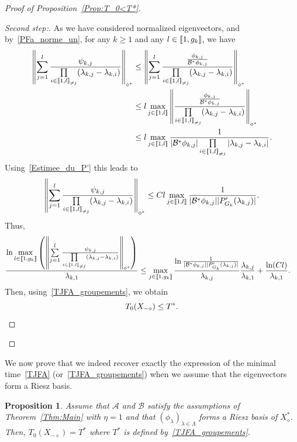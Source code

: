 \documentclass[11pt]{article}
\newtheorem{prop}[theo]{Proposition}
\theoremstyle{definition}
\newenvironment{proofc}{\begin{proof}}{\end{proof}}
\numberwithin{equation}{section}
\numberwithin{figure}{section}
\numberwithin{table}{section}
\newenvironment{step}[1]{\begin{proof}[#1]}{\let\qed\relax\end{proof}}
\newcommand{\llbracket}{\mathopen{[\mkern -2.7mu[}}
\newcommand{\rrbracket}{\mathclose{]\mkern -2.7mu]}}
\newcommand{\inter}[2]{\llbracket #1,#2 \rrbracket}
\newcommand{\interexclu}[3]{\llbracket #1,#2\rrbracket_{\neq #3}}
\newcommand\A{\mathcal{A}}
\newcommand\B{\mathcal{B}}
\newcommand\Bs{\mathcal{B}^*}
\newcommand{\Xalphas}{X_\diamond^*}
\newcommand{\Xmalpha}{X_{-\diamond}}
\newcommand{\normeXalphas}[1]{\left\| #1 \right\|_{\diamond^*}}
\newcommand{\n}{g}
\begin{document}
\begin{proofc}[{Proof of Proposition~\ref{Prop:T_0<T*}}]
\begin{step}{Second step:}
As we have considered normalized eigenvectors, and by~\eqref{PFa_norme_un}, for any $k \geq 1$ and any $l\in \inter{1}{\n_k}$, we have
\begin{align*}
\normeXalphas{ \sum\limits_{j=1}^l \frac{ \psi_{k,j} }{\prod\limits_{i\in \interexclu{1}{l}{j}} (\lambda_{k,j}-\lambda_{k,i})} } & \leq \normeXalphas{ \sum\limits_{j=1}^l \frac{ \frac{\phi_{k,j}}{\Bs \phi_{k,j}}}{\prod\limits_{i\in \interexclu{1}{l}{j}} (\lambda_{k,j}-\lambda_{k,i})} }
\\
&\leq l\max\limits_{j\in \inter{1}{l}} \normeXalphas{ \frac{ \frac{\phi_{k,j}}{\Bs \phi_{k,j}}}{\prod\limits_{i\in \interexclu{1}{l}{j}} (\lambda_{k,j}-\lambda_{k,i})} }
\\
&\leq l \max_{j\in \inter{1}{l}} \frac{1}{ | \Bs \phi_{k,j} | \prod\limits_{i\in \interexclu{1}{l}{j}}|\lambda_{k,j}-\lambda_{k,i} |}.
\end{align*}
Using~\eqref{Estimee_du_P'} this leads to
\begin{equation*}
\normeXalphas{ \sum\limits_{j=1}^l \frac{ \psi_{k,j} }{\prod\limits_{i\in \interexclu{1}{l}{j}} (\lambda_{k,j}-\lambda_{k,i})} }
\leq Cl \max_{j\in \inter{1}{l}} \frac{1}{ | \Bs \phi_{k,j} | | P_{G_k}'(\lambda_{k,j}) | }.
\end{equation*}
Thus,
\begin{align*}
\frac{\ln \max\limits_{l\in\inter{1}{\n_k}} \left(
\normeXalphas{ \sum\limits_{j=1}^l \frac{ \psi_{k,j} }{\prod\limits_{i\in \interexclu{1}{l}{j}} (\lambda_{k,j}-\lambda_{k,i})} }
\right) }{\lambda_{k,1}} &\leq \max_{j\in \inter{1}{\n_k}} \frac{\ln \frac{1}{ | \Bs \phi_{k,j} | | P_{G_k}'(\lambda_{k,j}) | }}{ \lambda _{k,j} } \frac{\lambda_{k,j}}{\lambda_{k,1} }+ \frac{\ln(C l)}{\lambda_{k,1}}.
\end{align*}
Then, using~\eqref{TJFA_groupements}, we obtain
\[
T_{0}(\Xmalpha)\leq T^*.\qedhere
\]
\end{step}\let\qed\relax
\end{proofc}


We now prove that we indeed recover exactly the expression of the minimal time~\eqref{TJFA} (or~\eqref{TJFA_groupements}) when we assume that the eigenvectors form a Riesz basis.

\begin{prop}\label{Prop:T_0>T*}
Assume that $\A$ and $\B$ satisfy the assumptions of Theorem~\ref{Thm:Main} with $\eta=1$ and that $(\phi_\lambda)_{\lambda\in \Lambda}$ forms a Riesz basis of $\Xalphas$. Then, $T_0(\Xmalpha)=T^*$ where $T^*$ is defined by~\eqref{TJFA_groupements}.
\end{prop}
\end{document}
